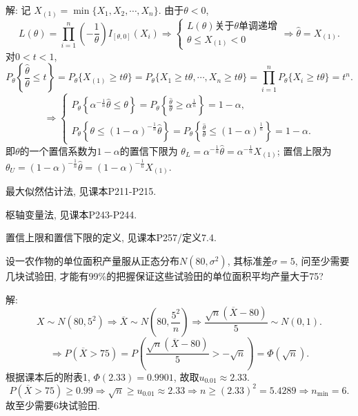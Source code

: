\documentclass[standard]{ExBook}
\renewenvironment{shaded}{%
  \def\FrameCommand{\fboxsep=\FrameSep \colorbox{shadecolor}}%
  \MakeFramed{\advance\hsize-\width \FrameRestore}%
}{%
  \endMakeFramed
}
\begin{document}
\begin{qitems}
解: 记
$
X_{(1)}=\min\{X_1,X_2,\cdots,X_n\}.
$
由于$\theta<0$,
$$
L(\theta)
=
\prod_{i=1}^{n}\left(-\frac{1}{\theta}\right)
I_{[\theta,0]}(X_i)
\Longrightarrow
\left\{
\begin{array}{l}
L(\theta)\text{关于}\theta\text{单调递增}\\
\theta\leq X_{(1)}<0
\end{array}
\right.
\Longrightarrow
\widehat{\theta}=X_{(1)}.
$$
对$0<t<1$,
$$
P_{\theta}\left\{\frac{\widehat{\theta}}{\theta}\leq t\right\}
=
P_{\theta}\{X_{(1)}\geq t\theta\}
=
P_{\theta}\{X_1\geq t\theta,\cdots,X_n\geq t\theta\}
=
\prod_{i=1}^{n}P_{\theta}\{X_i\geq t\theta\}
=
t^n.
$$
$$
\Longrightarrow
\left\{
\begin{array}{l}
P_{\theta}\left\{
\alpha^{-\frac{1}{n}}\widehat{\theta}\leq\theta
\right\}
=
P_{\theta}\left\{
\frac{\widehat{\theta}}{\theta}\geq\alpha^{\frac{1}{n}}
\right\}
=
1-\alpha,\\[0.6em]
P_{\theta}\left\{
\theta\leq(1-\alpha)^{-\frac{1}{n}}\widehat{\theta}
\right\}
=
P_{\theta}\left\{
\frac{\widehat{\theta}}{\theta}\leq(1-\alpha)^{\frac{1}{n}}
\right\}
=
1-\alpha.
\end{array}
\right.
$$
即$\theta$的一个置信系数为$1-\alpha$的置信下限为
$
\theta_L
=
\alpha^{-\frac{1}{n}}\widehat{\theta}
=
\alpha^{-\frac{1}{n}}X_{(1)}
$;
置信上限为
$
\theta_U
=
(1-\alpha)^{-\frac{1}{n}}\widehat{\theta}
=
(1-\alpha)^{-\frac{1}{n}}X_{(1)}.
$

\textcolor{themeColor}{\selectfont {} 最大似然估计法, 见课本P211-P215.}

\textcolor{themeColor}{\selectfont {} 枢轴变量法, 见课本P243-P244.}

\textcolor{themeColor}{\selectfont {}
置信上限和置信下限的定义, 见课本P257/定义7.4.}

\vspace{2.5cm-5em}

    \begin{bbox}
    \begin{shaded}
        \qitem
设一农作物的单位面积产量服从正态分布$N(80,\sigma^2)$, 其标准差$\sigma=5$, 问至少需要几块试验田, 才能有99\%的把握保证这些试验田的单位面积平均产量大于75?
    \end{shaded}
    \end{bbox}

\vspace{\dimexpr2.5cm-5em\relax}

解:
$$
X\sim N(80,5^2)
\Longrightarrow
\overline{X}\sim N\left(80,\frac{5^2}{n}\right)
\Longrightarrow
\frac{\sqrt{n}(\overline{X}-80)}{5}\sim N(0,1).
$$
$$
\Longrightarrow
P(\overline{X}>75)
=
P\left(
\frac{\sqrt{n}(\overline{X}-80)}{5}
>-\sqrt{n}
\right)
=
\Phi(\sqrt{n}).
$$
根据课本后的附表1, $\Phi(2.33)=0.9901$, 故取$u_{0.01}\approx2.33$.
$$
P(\overline{X}>75)\geq0.99
\Longrightarrow
\sqrt{n}\geq u_{0.01}\approx2.33
\Longrightarrow
n\geq(2.33)^2=5.4289
\Longrightarrow
n_{\min}=6.
$$
故至少需要6块试验田.


\end{qitems}
\end{document}
